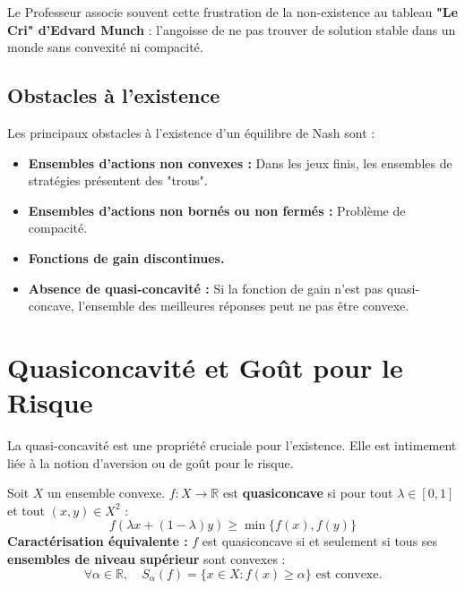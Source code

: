 \begin{remarque}
Le Professeur associe souvent cette frustration de la non-existence au tableau \textbf{"Le Cri" d'Edvard Munch} : l'angoisse de ne pas trouver de solution stable dans un monde sans convexité ni compacité.
\end{remarque}

\subsection{Obstacles à l'existence}
Les principaux obstacles à l'existence d'un équilibre de Nash sont :
\begin{itemize}
    \item \textbf{Ensembles d'actions non convexes :} Dans les jeux finis, les ensembles de stratégies présentent des "trous".
    \item \textbf{Ensembles d'actions non bornés ou non fermés : } Problème de compacité.
    \item \textbf{Fonctions de gain discontinues.}
    \item \textbf{Absence de quasi-concavité :} Si la fonction de gain n'est pas quasi-concave, l'ensemble des meilleures réponses peut ne pas être convexe.
\end{itemize}

\section{Quasiconcavité et Goût pour le Risque}

La quasi-concavité est une propriété cruciale pour l'existence. Elle est intimement liée à la notion d'aversion ou de goût pour le risque.

\begin{definition}[Quasiconcavité]
Soit $X$ un ensemble convexe. $f: X \rightarrow \mathbb{R}$ est \textbf{quasiconcave} si pour tout $\lambda \in [0,1]$ et tout $(x, y) \in X^2$ :
$$f(\lambda x + (1-\lambda)y) \ge \min\{f(x), f(y)\}$$
\textbf{Caractérisation équivalente :} $f$ est quasiconcave si et seulement si tous ses \textbf{ensembles de niveau supérieur} sont convexes :
$$\forall \alpha \in \mathbb{R}, \quad S_{\alpha}(f) = \{x \in X : f(x) \ge \alpha\} \text{ est convexe.}$$
\end{definition}

